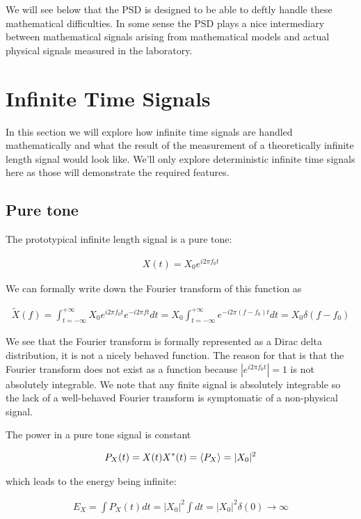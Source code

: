 \documentclass[12pt]{article}
\begin{document}
We will see below that the PSD is designed to be able to deftly handle these mathematical difficulties. 
In some sense the PSD plays a nice intermediary between mathematical signals arising from mathematical models and actual physical signals measured in the laboratory. 

\section{Infinite Time Signals}

In this section we will explore how infinite time signals are handled mathematically and what the result of the measurement of a theoretically infinite length signal would look like.
We'll only explore deterministic infinite time signals here as those will demonstrate the required features.

\subsection{Pure tone}
The prototypical infinite length signal is a pure tone:

\begin{align}
X(t) = X_0 e^{i2\pi f_0 t}
\end{align}

We can formally write down the Fourier transform of this function as

\begin{align}
\tilde{X}(f) = \int_{t=-\infty}^{+\infty} X_0 e^{i2\pi f_0t} e^{-i2\pi f t} dt = X_0 \int_{t=-\infty}^{+\infty} e^{-i 2\pi (f-f_0) t}dt = X_0 \delta(f-f_0)
\end{align}

We see that the Fourier transform is formally represented as a Dirac delta distribution, it is not a nicely behaved function.
The reason for that is that the Fourier transform does not exist as a function because $|e^{i2\pi f_0t}|= 1$ is not absolutely integrable.
We note that any finite signal is absolutely integrable so the lack of a well-behaved Fourier transform is symptomatic of a non-physical signal.

The power in a pure tone signal is constant

\begin{align}
P_X(t) = X(t)X^*(t) = \Braket{P_X} = |X_0|^2
\end{align}

which leads to the energy being infinite:

\begin{align}
E_X = \int P_X(t) dt = |X_0|^2\int dt = |X_0|^2 \delta(0) \rightarrow \infty
\end{align}
\end{document}

